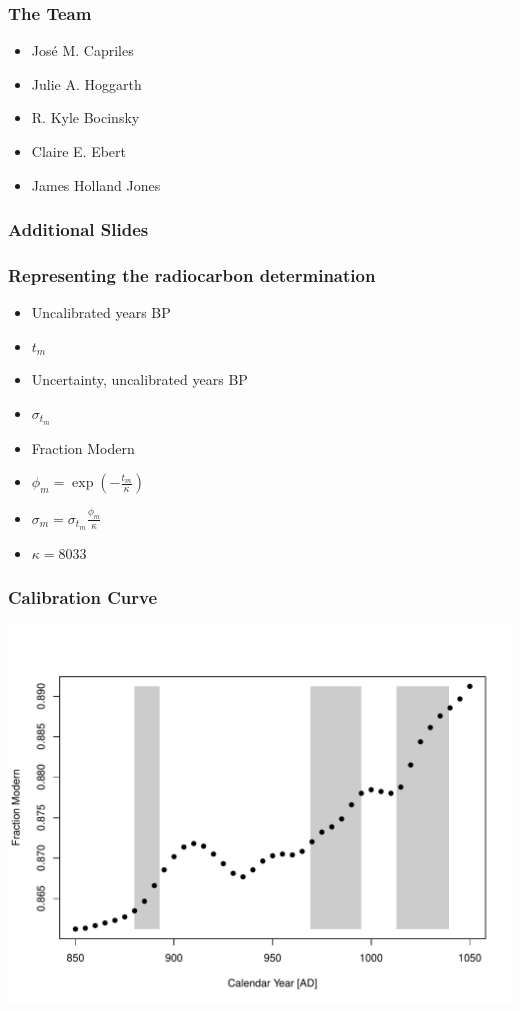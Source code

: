 \documentclass{beamer}
\begin{document}
\begin{frame}[c]
    \frametitle{The Team}
    \begin{itemize}
      \item José M. Capriles
      \item Julie A. Hoggarth
      \item R. Kyle Bocinsky
      \item Claire E. Ebert
      \item James Holland Jones
  \end{itemize}
\end{frame}

\begin{frame}[t]
  \frametitle{Additional Slides}
\end{frame}

\begin{frame}[t]
  \frametitle{Representing the radiocarbon determination}
    \begin{itemize}
    \item Uncalibrated years BP
    \item $t_{m}$
    \pause
    \item Uncertainty, uncalibrated years BP
    \item $\sigma_{t_m}$
    \pause
    \item Fraction Modern
    \item $\phi_m = \exp(-\frac{t_m}{\kappa})$
    \item $\sigma_m = \sigma_{t_m} \frac{\phi_m}{\kappa}$
    \item $\kappa=8033$
    \end{itemize}
 
\end{frame}

\begin{frame}[t]
  \frametitle{Calibration Curve}
    \includegraphics[height=.85\textheight]{single_obs_inf_plot2.pdf}
\end{frame}
\end{document}
